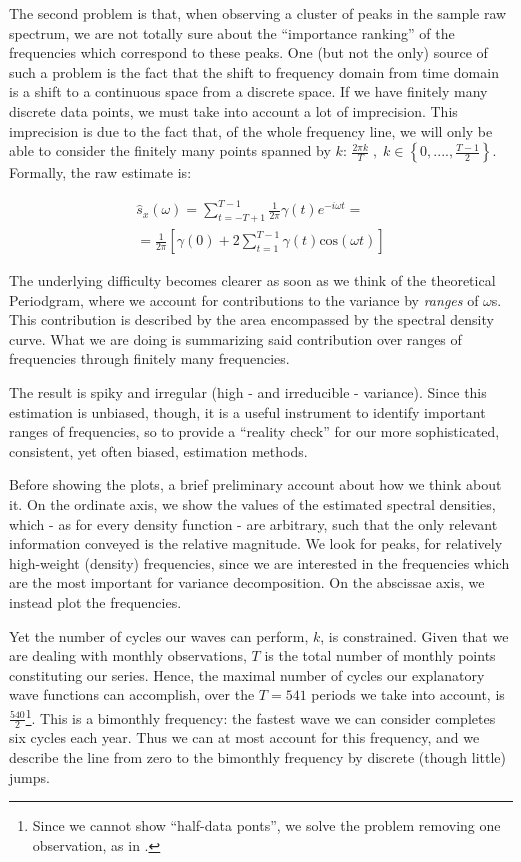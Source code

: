 \documentclass[12pt]{article} %
\begin{document}
The second problem is that, when observing a cluster of peaks in the sample raw spectrum, we are not totally sure about the ``importance ranking'' of the frequencies which correspond to these peaks. One (but not the only) source of such a problem is the fact that the shift to frequency domain from time domain is a shift to a continuous space from a discrete space. If we have finitely many discrete data points, we must take into account a lot of imprecision. This imprecision is due to the fact that, of the whole frequency line, we will only be able to consider the finitely many points spanned by $k$: $\frac{2\pi k}{T}\;,\;k\in\left\{0,....,\frac{T-1}{2}\right\}$. Formally, the raw estimate is:

\begin{equation}
\begin{aligned}
\hat{s}_x(\omega)=\sum\limits_{t=-T+1}^{T-1} \frac{1}{2\pi} \gamma(t)e^{-i\omega t}=\\
=\frac{1}{2\pi}\left[\gamma(0)+2\sum\limits_{t=1}^{T-1} \gamma(t)\text{cos}(\omega t)\right]
\end{aligned}
\end{equation}

The underlying difficulty becomes clearer as soon as we think of the theoretical Periodgram, where we account for contributions to the variance by {\em ranges} of $\omega$s. This contribution is described by the area encompassed by the spectral density curve. What we are doing is summarizing said contribution over ranges of frequencies through finitely many frequencies.

The result is spiky and irregular (high - and irreducible - variance). Since this estimation is unbiased, though, it is a useful instrument to identify important ranges of frequencies, so to provide a ``reality check'' for our more sophisticated, consistent, yet often biased, estimation methods. 

Before showing the plots, a brief preliminary account about how we think about it. On the ordinate axis, we show the values of the estimated spectral densities, which - as for every density function - are arbitrary, such that the only relevant information conveyed is the relative magnitude. We look for peaks, for relatively high-weight (density) frequencies, since we are interested in the frequencies which are the most important for variance decomposition. On the abscissae axis, we instead plot the frequencies. 

Yet the number of cycles our waves can perform, $k$,  is constrained. Given that we are dealing with monthly observations, $T$ is the total number of monthly points constituting our series. Hence, the maximal number of cycles our explanatory wave functions can accomplish, over the $T=541$ periods we take into account, is $\frac{540}{2}$\footnote{Since we cannot show ``half-data ponts'', we solve the problem removing one observation, as in \citet{hammy}.}. This is a bimonthly frequency: the fastest wave we can consider completes six cycles each year. Thus we can at most account for this frequency, and we describe the line from zero to the bimonthly frequency by discrete (though little) jumps.
\end{document}
